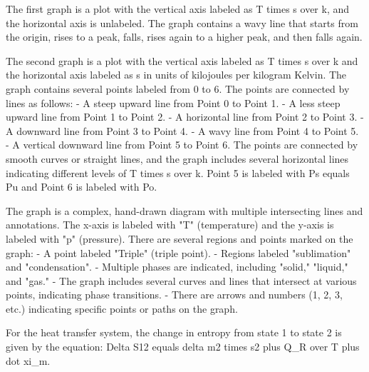 The first graph is a plot with the vertical axis labeled as T times s over k, and the horizontal axis is unlabeled. The graph contains a wavy line that starts from the origin, rises to a peak, falls, rises again to a higher peak, and then falls again.

The second graph is a plot with the vertical axis labeled as T times s over k and the horizontal axis labeled as s in units of kilojoules per kilogram Kelvin. The graph contains several points labeled from 0 to 6. The points are connected by lines as follows:
- A steep upward line from Point 0 to Point 1.
- A less steep upward line from Point 1 to Point 2.
- A horizontal line from Point 2 to Point 3.
- A downward line from Point 3 to Point 4.
- A wavy line from Point 4 to Point 5.
- A vertical downward line from Point 5 to Point 6.
The points are connected by smooth curves or straight lines, and the graph includes several horizontal lines indicating different levels of T times s over k. Point 5 is labeled with Ps equals Pu and Point 6 is labeled with Po.

The graph is a complex, hand-drawn diagram with multiple intersecting lines and annotations. The x-axis is labeled with "T" (temperature) and the y-axis is labeled with "p" (pressure). There are several regions and points marked on the graph:
- A point labeled "Triple" (triple point).
- Regions labeled "sublimation" and "condensation".
- Multiple phases are indicated, including "solid," "liquid," and "gas."
- The graph includes several curves and lines that intersect at various points, indicating phase transitions.
- There are arrows and numbers (1, 2, 3, etc.) indicating specific points or paths on the graph.

For the heat transfer system, the change in entropy from state 1 to state 2 is given by the equation:
Delta S12 equals delta m2 times s2 plus Q_R over T plus dot xi_m.